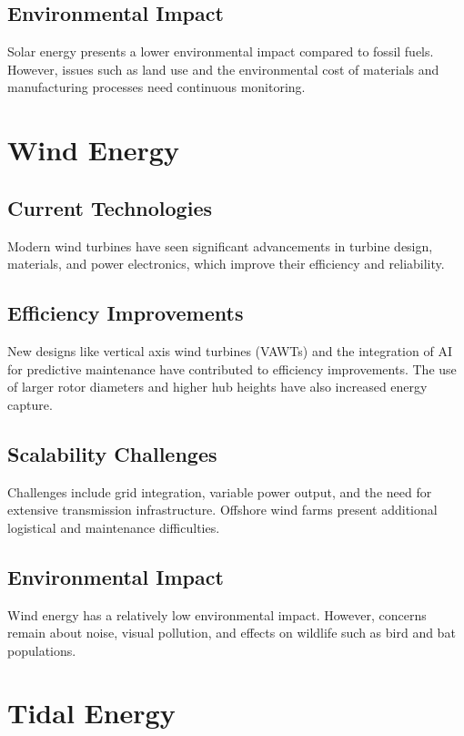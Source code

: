 \documentclass[12pt]{article}
\begin{document}
\subsection{Environmental Impact}
Solar energy presents a lower environmental impact compared to fossil fuels. However, issues such as land use and the environmental cost of materials and manufacturing processes need continuous monitoring\cite{Fthenakis2009}.

\section{Wind Energy}
\subsection{Current Technologies}
Modern wind turbines have seen significant advancements in turbine design, materials, and power electronics, which improve their efficiency and reliability\cite{Hau2013}.

\subsection{Efficiency Improvements}
New designs like vertical axis wind turbines (VAWTs) and the integration of AI for predictive maintenance have contributed to efficiency improvements\cite{Islam2013,Brown2019}. The use of larger rotor diameters and higher hub heights have also increased energy capture\cite{Mekonnen2018}.

\subsection{Scalability Challenges}
Challenges include grid integration, variable power output, and the need for extensive transmission infrastructure\cite{Togeby2012}. Offshore wind farms present additional logistical and maintenance difficulties.

\subsection{Environmental Impact}
Wind energy has a relatively low environmental impact. However, concerns remain about noise, visual pollution, and effects on wildlife such as bird and bat populations\cite{Mathews2016}.

\section{Tidal Energy}
\end{document}
